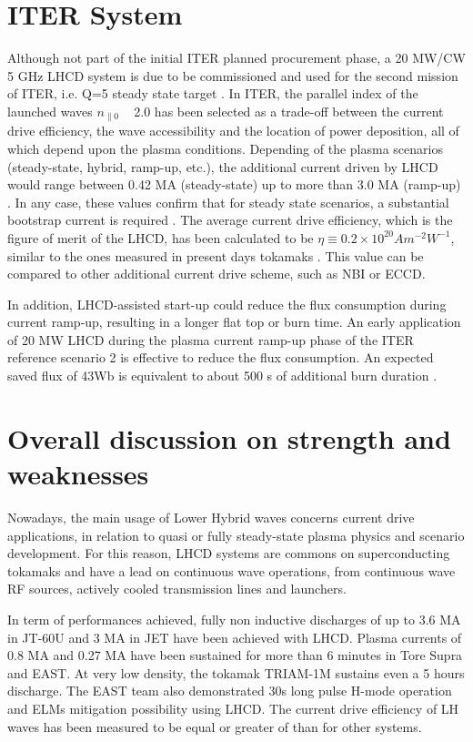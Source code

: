 \section{ITER System}

Although not part of the initial ITER planned procurement phase, a 20 MW/CW 5 GHz LHCD system is due to be commissioned and used for the second mission of ITER, i.e. Q=5 steady state target \parencite{Hoang2009}. In ITER, the parallel index of the launched waves $n_{\parallel 0}$ ~ 2.0 has been selected as a trade-off between the current drive efficiency, the wave accessibility and the location of power deposition, all of which depend upon the plasma conditions. Depending of the plasma scenarios (steady-state, hybrid, ramp-up, etc.), the additional current driven by LHCD would range between 0.42 MA (steady-state) up to more than 3.0 MA (ramp-up) \parencite{Decker2011}. In any case, these values confirm that for steady state scenarios, a substantial bootstrap current is required \parencite{ITERPhysics_Chap6}. The average current drive efficiency, which is the figure of merit of the LHCD, has been calculated to be $\eta \equiv 0.2 \times 10^{20} A m^{-2} W^{-1}$, similar to the ones measured in present days tokamaks \parencite{ITERPhysics_Chap6}. This value can be compared to other additional current drive scheme, such as NBI or ECCD. 

In addition, LHCD-assisted start-up could reduce the flux consumption during current ramp-up, resulting in a longer flat top or burn time. An early application of 20 MW LHCD during the plasma current ramp-up phase of the ITER reference scenario 2 is effective to reduce the flux consumption. An expected saved flux of 43Wb is equivalent to about 500 s of additional burn duration \parencite{Hoang2009}.

\section{Overall discussion on strength and weaknesses}
Nowadays, the main usage of Lower Hybrid waves concerns current drive applications, in relation to quasi or fully steady-state plasma physics and scenario development. For this reason, LHCD systems are commons on superconducting tokamaks and have a lead on continuous wave operations, from continuous wave RF sources, actively cooled transmission lines and launchers.  

In term of performances achieved, fully non inductive discharges of up to 3.6 MA in JT-60U and 3 MA in JET have been achieved with LHCD. Plasma currents of 0.8 MA and 0.27 MA have been sustained for more than 6 minutes in Tore Supra and EAST. At very low density, the tokamak TRIAM-1M sustains even a 5 hours discharge. The EAST team also demonstrated 30s long pulse H-mode operation and ELMs mitigation possibility using LHCD. The current drive efficiency of LH waves has been measured to be equal or greater of than for other systems.

